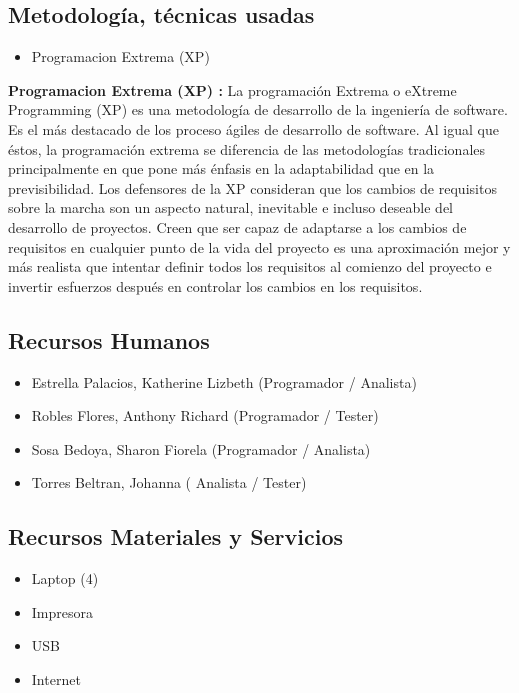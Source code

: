 \documentclass[preprint,12pt]{elsarticle}
\begin{document}
	\subsection{Metodología, técnicas usadas }	
	
	\begin{itemize}
    \item Programacion Extrema (XP) 

	\end{itemize}
	
	\textbf{Programacion Extrema (XP) :} La programación Extrema o eXtreme Programming (XP) es una metodología de desarrollo de la ingeniería de software. Es el más destacado de los proceso ágiles de desarrollo de software. Al igual que éstos, la programación extrema se diferencia de las metodologías tradicionales principalmente en que pone más énfasis en la adaptabilidad que en la previsibilidad. Los defensores de la XP consideran que los cambios de requisitos sobre la marcha son un aspecto natural, inevitable e incluso deseable del desarrollo de proyectos. Creen que ser capaz de adaptarse a los cambios de requisitos en cualquier punto de la vida del proyecto es una aproximación mejor y más realista que intentar definir todos los requisitos al comienzo del proyecto e invertir esfuerzos después en controlar los cambios en los requisitos.
		

\subsection{\textbf{Recursos Humanos}}
\begin{itemize}
	\item Estrella Palacios, Katherine Lizbeth (Programador / Analista)
	\item Robles Flores, Anthony Richard (Programador / Tester)
	\item Sosa Bedoya, Sharon Fiorela (Programador / Analista)
	\item Torres Beltran, Johanna ( Analista / Tester)
\end{itemize}

\subsection{\textbf{Recursos Materiales y Servicios}}
\begin{itemize}
	\item Laptop (4)
	\item Impresora
	\item USB
	\item Internet
\end{itemize}
	
\end{document}
